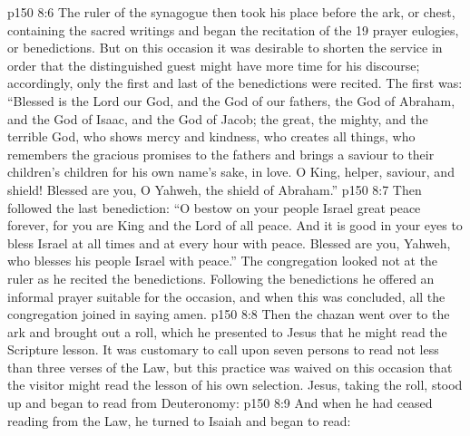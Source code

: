 \vs p150 8:6 The ruler of the synagogue then took his place before the ark, or chest, containing the sacred writings and began the recitation of the 19 prayer eulogies, or benedictions. But on this occasion it was desirable to shorten the service in order that the distinguished guest might have more time for his discourse; accordingly, only the first and last of the benedictions were recited. The first was: “Blessed is the Lord our God, and the God of our fathers, the God of Abraham, and the God of Isaac, and the God of Jacob; the great, the mighty, and the terrible God, who shows mercy and kindness, who creates all things, who remembers the gracious promises to the fathers and brings a saviour to their children’s children for his own name’s sake, in love. O King, helper, saviour, and shield! Blessed are you, O Yahweh, the shield of Abraham.”
\vs p150 8:7 Then followed the last benediction: “O bestow on your people Israel great peace forever, for you are King and the Lord of all peace. And it is good in your eyes to bless Israel at all times and at every hour with peace. Blessed are you, Yahweh, who blesses his people Israel with peace.” The congregation looked not at the ruler as he recited the benedictions. Following the benedictions he offered an informal prayer suitable for the occasion, and when this was concluded, all the congregation joined in saying amen.
\vs p150 8:8 Then the chazan went over to the ark and brought out a roll, which he presented to Jesus that he might read the Scripture lesson. It was customary to call upon seven persons to read not less than three verses of the Law, but this practice was waived on this occasion that the visitor might read the lesson of his own selection. Jesus, taking the roll, stood up and began to read from Deuteronomy: 
\vs p150 8:9 And when he had ceased reading from the Law, he turned to Isaiah and began to read: 
